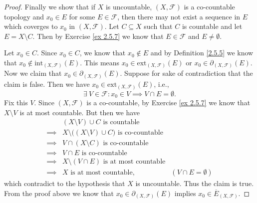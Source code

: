 \begin{proof}
    Finally we show that if \(X\) is uncountable, \((X, \mathcal{F})\) is a co-countable topology and \(x_0 \in E\) for some \(E \in \mathcal{F}\), then there may not exist a sequence in \(E\) which coverges to \(x_0\) in \((X, \mathcal{F})\).
    Let \(C \subseteq X\) such that \(C\) is countable and let \(E = X \setminus C\).
    Then by Exercise \ref{ex 2.5.7} we know that \(E \in \mathcal{F}\) and \(E \neq \emptyset\).

    Let \(x_0 \in C\).
    Since \(x_0 \in C\), we know that \(x_0 \notin E\) and by Definition \ref{2.5.5} we know that \(x_0 \notin \text{int}_{(X, \mathcal{F})}(E)\).
    This means \(x_0 \in \text{ext}_{(X, \mathcal{F})}(E)\) or \(x_0 \in \partial_{(X, \mathcal{F})}(E)\).
    Now we claim that \(x_0 \in \partial_{(X, \mathcal{F})}(E)\).
    Suppose for sake of contradiction that the claim is false.
    Then we have \(x_0 \in \text{ext}_{(X, \mathcal{F})}(E)\), i.e.,
    \[
        \exists\ V \in \mathcal{F} : x_0 \in V \implies V \cap E = \emptyset.
    \]
    Fix this \(V\).
    Since \((X, \mathcal{F})\) is a co-countable, by Exercise \ref{ex 2.5.7} we know that \(X \setminus V\) is at most countable.
    But then we have
    \begin{align*}
                 & (X \setminus V) \cup C \text{ is countable}                                                   \\
        \implies & X \setminus \big((X \setminus V) \cup C\big) \text{ is co-countable}                          \\
        \implies & V \cap (X \setminus C) \text{ is co-countable}                                                \\
        \implies & V \cap E \text{ is co-countable}                                                              \\
        \implies & X \setminus (V \cap E) \text{ is at most countable}                                           \\
        \implies & X \text{ is at most countable},                                      & (V \cap E = \emptyset)
    \end{align*}
    which contradict to the hypothesis that \(X\) is uncountable.
    Thus the claim is true.
    From the proof above we know that \(x_0 \in \partial_{(X, \mathcal{F})}(E)\) implies \(x_0 \in \overline{E}_{(X, \mathcal{F})}\).


\end{proof}
